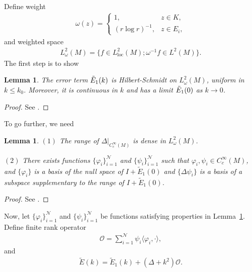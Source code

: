 \documentclass[12pt]{amsart}
\newtheorem{lemma}[theorem]{Lemma}
\begin{document}
Define weight
\begin{align*}
    \omega(z) = \begin{cases}
        1, &z\in K,\\
        (r \log{r})^{-1}, &z\in E_i,
    \end{cases}
\end{align*}
and weighted space
\begin{align*}
    L^2_\omega(M) = \{f\in L^2_{\textrm{loc}}(M); \omega^{-1}f \in L^2(M)\}.
\end{align*}
The first step is to show





\begin{lemma}\label{A5}
    The error term $\Tilde{E}_1(k)$ is Hilbert-Schmidt on $L^2_{\omega}(M)$, uniform in $k\le k_0$. Moreover, it is continuous in $k$ and has a limit $\Tilde{E}_1(0)$ as $k\to 0$.
\end{lemma}

\begin{proof}
    See \cite[Lemma~3.1]{HNS}.
\end{proof}

To go further, we need

\begin{lemma}\label{null}
$(1)$ The range of $\Delta \big|_{C_c^\infty(M)}$ is dense in $L^2_{\omega}(M)$.

$(2)$ There exists functions $\{\varphi_i\}_{i=1}^{\mathcal{N}}$ and $\{\psi_i\}_{i=1}^{\mathcal{N}}$ such that $\varphi_i, \psi_i\in C_c^\infty(M)$, and $\{\varphi_i\}$ is a basis of the null space of $I+\tilde{E}_1(0)$ and $\{\Delta \psi_i\}$ is a basis of a subspace supplementary to the range of $I+\tilde{E}_1(0)$.
\end{lemma}

\begin{proof}
See \cite[Lemma~ 3.3, 3.4]{HNS}.
\end{proof}

Now, let $\{\varphi_i\}_{i=1}^{\mathcal{N}}$ and $\{\psi_i\}_{i=1}^{\mathcal{N}}$ be functions satisfying properties in Lemma~\ref{null}. Define finite rank operator
\begin{align*}
    \mathcal{O} = \sum_{i=1}^{\mathcal{N}} \psi_i \langle \varphi_i, \cdot \rangle,
\end{align*}
and 
\begin{align*}
    \tilde{E}(k) = \tilde{E}_1(k) + (\Delta+k^2)\mathcal{O}.
\end{align*}
\end{document}
